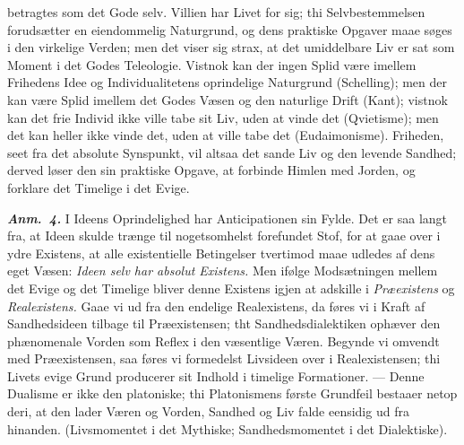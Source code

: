 \documentclass[12pt]{book}
\newcommand{\anm}[1]{\emph{\textbf{Anm.~#1.}}}
\newcommand{\opage}[1]{\marginnote{\footnotesize\textit{[#1]}}}
\begin{document}
betragtes som det Gode selv. Villien har Livet for sig; thi Selvbestemmelsen forudsætter
en eiendommelig Naturgrund, og dens praktiske Opgaver maae søges i den virkelige Verden;
men det viser sig strax, at det umiddelbare Liv er sat som Moment i det Godes Teleologie.
Vistnok kan der ingen Splid være imellem Frihedens Idee og Individualitetens oprindelige
Naturgrund (Schelling); men der kan være Splid imellem det Godes Væsen og den naturlige
Drift (Kant); vistnok kan det frie Individ ikke ville tabe sit Liv, uden at vinde det
(Qvietisme); men det kan heller ikke vinde det, uden at ville tabe det (Eudaimonisme).
Friheden, seet fra det absolute Synspunkt, vil altsaa det sande Liv og den levende
Sandhed; derved løser den sin praktiske Opgave, at forbinde Himlen med Jorden, og
forklare det Timelige i det Evige.

\anm{4} I Ideens Oprindelighed har Anticipationen sin Fylde. Det er saa langt fra, at
Ideen skulde trænge til nogetsomhelst forefundet Stof, for at gaae over i ydre Existens,
at alle existentielle Betingelser tvertimod maae udledes af dens eget Væsen:
\emph{Ideen selv har absolut Existens.} Men ifølge Modsætningen mellem det Evige og det
Timelige bliver denne Existens igjen at adskille i \emph{Præexistens} og
\emph{Realexistens.} Gaae vi ud fra den endelige Realexistens, da føres vi i Kraft af
Sandhedsideen tilbage til Præexistensen; tht Sandhedsdialektiken ophæver den phænomenale
Vorden som Reflex i den væsentlige Væren. Begynde vi omvendt med Præexistensen, saa føres
vi formedelst Livsideen over i Realexistensen; thi Livets evige Grund producerer sit
Indhold i timelige Formationer. --- Denne Dualisme er ikke den platoniske; thi
Platonismens første Grundfeil bestaaer
\opage{255} netop deri, at den lader Væren og Vorden, Sandhed og Liv falde eensidig ud fra hinanden.
(Livsmomentet i det Mythiske; Sandhedsmomentet i det Dialektiske).
\end{document}
